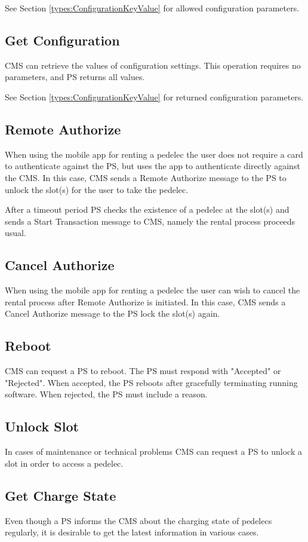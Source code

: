  See Section \ref{types:ConfigurationKeyValue} for allowed configuration parameters.

\subsection{Get Configuration}

\acs{CMS} can retrieve the values of configuration settings. This operation requires no parameters, and \acs{PS} returns all values.

 See Section \ref{types:ConfigurationKeyValue} for returned configuration parameters.

\subsection{Remote Authorize}

When using the mobile app for renting a pedelec the user does not require a card to authenticate against the \acs{PS}, but uses the app to authenticate directly against the \acs{CMS}. In this case, \acs{CMS} sends a Remote Authorize message to the \acs{PS} to unlock the slot(s) for the user to take the pedelec. 

After a timeout period \acs{PS} checks the existence of a pedelec at the slot(s) and sends a Start Transaction message to \acs{CMS}, namely the rental process proceeds usual.

\subsection{Cancel Authorize}

When using the mobile app for renting a pedelec the user can wish to cancel the rental process after Remote Authorize is initiated. In this case, \acs{CMS} sends a Cancel Authorize message to the \acs{PS} lock the slot(s) again.

\subsection{Reboot}

\acs{CMS} can request a \acs{PS} to reboot. The \acs{PS} must respond with "Accepted" or "Rejected". When accepted, the \acs{PS} reboots after gracefully terminating running software. When rejected, the \acs{PS} must include a reason.

\subsection{Unlock Slot}

In cases of maintenance or technical problems \acs{CMS} can request a \acs{PS} to unlock a slot in order to access a pedelec.

\subsection{Get Charge State}

Even though a \acs{PS} informs the \acs{CMS} about the charging state of pedelecs regularly, it is desirable to get the latest information in various cases.